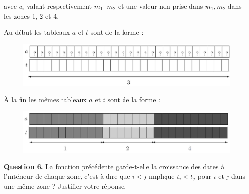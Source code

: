 \documentclass[11pt,a4paper]{article}
\begin{document}
avec $a_i$ valant respectivement $m_1$, $m_2$ et une valeur non prise dans {$m_1, m_2$} dans les zones 1, 2 et 4.

Au début les tableaux $a$ et $t$ sont de la forme :

\bigskip


\begin{figure}[h]
\begin{center}
\includegraphics[scale=0.21]{Image2.jpg} 
\end{center}
\end{figure}

À la fin les mêmes tableaux $a$ et $t$ sont de la forme :

\bigskip

\begin{figure}[h]
\begin{center}
\includegraphics[scale=0.21]{Image3.jpg} 
\end{center}
\end{figure}

\textbf{Question 6.} La fonction précédente garde-t-elle la croissance des dates à l’intérieur de chaque zone, c’est-à-dire que $i < j$ implique $t_i < t_j$ pour $i$ et $j$ dans une même zone ? Justifier votre réponse.
\end{document}
